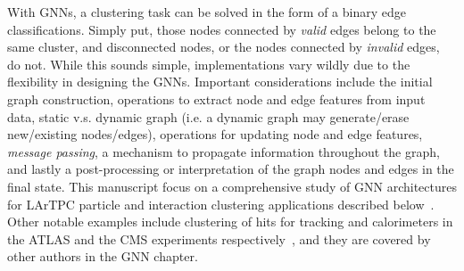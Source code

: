 \documentclass{ws-rv9x6}
\begin{document}
With GNNs, a clustering task can be solved in the form of a binary edge classifications. Simply put, those nodes connected by {\it valid} edges belong to the same cluster, and disconnected nodes, or the nodes connected by {\it invalid} edges, do not.  While this sounds simple, implementations vary wildly due to the flexibility in designing the GNNs. Important considerations include the initial graph construction, operations to extract node and edge features from input data, static v.s. dynamic graph (i.e. a dynamic graph may generate/erase new/existing nodes/edges), operations for updating node and edge features, {\it message passing}, a mechanism to propagate information throughout the graph, and lastly a post-processing or interpretation of the graph nodes and edges in the final state. This manuscript focus on a comprehensive study of GNN architectures for LArTPC particle and interaction clustering applications described below~\cite{drielsma2020clustering}. Other notable examples include clustering of hits for tracking and calorimeters in the ATLAS and the CMS experiments respectively~\cite{ju2020graph}, and they are covered by other authors in the GNN chapter.

\end{document}
